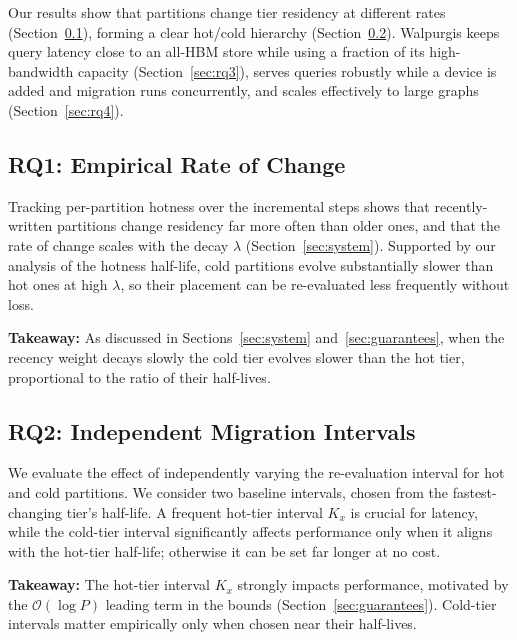 \documentclass{article}
\begin{document}
Our results show that partitions change tier residency at different rates
(Section~\ref{sec:rq1}), forming a clear hot/cold hierarchy (Section~\ref{sec:rq2}).
Walpurgis keeps query latency close to an all-HBM store while using a fraction of its
high-bandwidth capacity (Section~\ref{sec:rq3}), serves queries robustly while a device
is added and migration runs concurrently, and scales effectively to large graphs
(Section~\ref{sec:rq4}).

\subsection{RQ1: Empirical Rate of Change}
\label{sec:rq1}

Tracking per-partition hotness over the incremental steps shows that recently-written
partitions change residency far more often than older ones, and that the rate of change
scales with the decay $\lambda$ (Section~\ref{sec:system}). Supported by our analysis of
the hotness half-life, cold partitions evolve substantially slower than hot ones at high
$\lambda$, so their placement can be re-evaluated less frequently without loss.

\textbf{Takeaway:} As discussed in Sections~\ref{sec:system} and~\ref{sec:guarantees},
when the recency weight decays slowly the cold tier evolves slower than the hot tier,
proportional to the ratio of their half-lives.

\subsection{RQ2: Independent Migration Intervals}
\label{sec:rq2}

We evaluate the effect of independently varying the re-evaluation interval for hot and
cold partitions. We consider two baseline intervals, chosen from the fastest-changing
tier's half-life. A frequent hot-tier interval $K_x$ is crucial for latency, while the
cold-tier interval significantly affects performance only when it aligns with the
hot-tier half-life; otherwise it can be set far longer at no cost.

\textbf{Takeaway:} The hot-tier interval $K_x$ strongly impacts performance, motivated by
the $\mathcal{O}(\log P)$ leading term in the bounds (Section~\ref{sec:guarantees}).
Cold-tier intervals matter empirically only when chosen near their half-lives.
\end{document}
